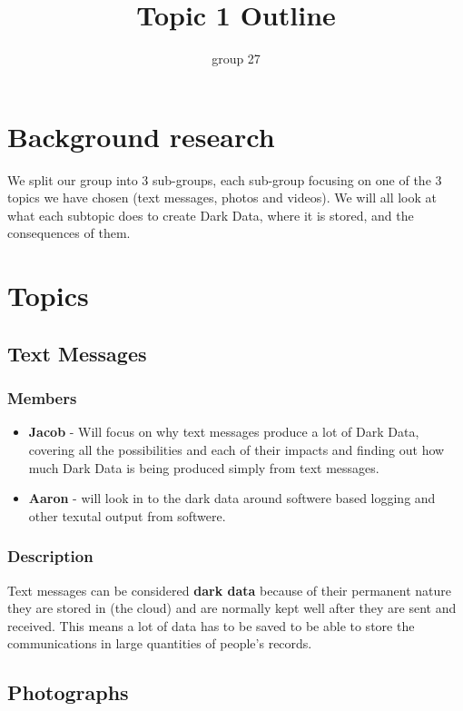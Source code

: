 \documentclass{article}
\begin{document}
\title{Topic 1 Outline}
\author{group 27}

\maketitle
\newpage

\section{Background research}
We split our group into 3 sub-groups, each sub-group focusing on one of the 3 topics we have chosen (text messages,
photos and videos). We will all look at what each subtopic does to create Dark Data, where it is stored, and the
consequences of them.

\section{Topics}
    \subsection{Text Messages} 
        \subsubsection{Members}
        \begin{itemize}
            \item \textbf{Jacob} - Will focus on why text messages produce a lot of Dark Data, covering all the 
            possibilities and each of their impacts and finding out how much Dark Data is being produced simply from text 
            messages.
            \item \textbf{Aaron} - will look in to the dark data around softwere based logging and other texutal output from softwere.

        \end{itemize}
        \subsubsection{Description}
        Text messages can be considered \textbf{dark data} because of their permanent nature they are stored in (the cloud) and 
        are normally kept well after they are sent and received. This means a lot of data has to be saved to be able to
        store the communications in large quantities of people's records. 

    \subsection{Photographs}
\end{document}

